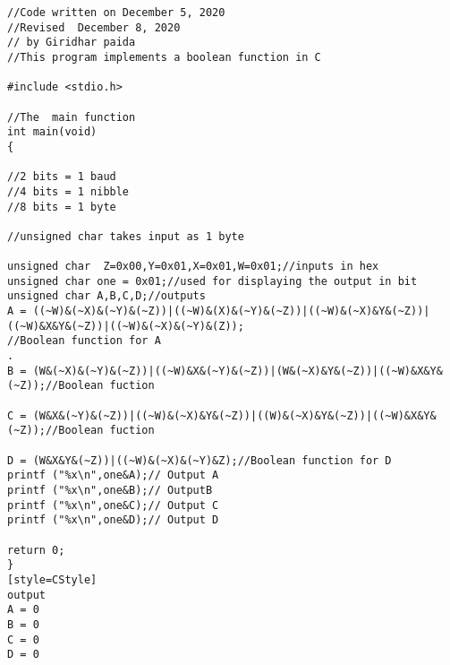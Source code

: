 \documentclass{article}
\begin{document}
\begin{lstlisting}[style=CStyle]
//Code written on December 5, 2020
//Revised  December 8, 2020
// by Giridhar paida
//This program implements a boolean function in C

#include <stdio.h>

//The  main function
int main(void)
{

//2 bits = 1 baud
//4 bits = 1 nibble
//8 bits = 1 byte

//unsigned char takes input as 1 byte

unsigned char  Z=0x00,Y=0x01,X=0x01,W=0x01;//inputs in hex	
unsigned char one = 0x01;//used for displaying the output in bit
unsigned char A,B,C,D;//outputs
A = ((~W)&(~X)&(~Y)&(~Z))|((~W)&(X)&(~Y)&(~Z))|((~W)&(~X)&Y&(~Z))|((~W)&X&Y&(~Z))|((~W)&(~X)&(~Y)&(Z));
//Boolean function for A
.
B = (W&(~X)&(~Y)&(~Z))|((~W)&X&(~Y)&(~Z))|(W&(~X)&Y&(~Z))|((~W)&X&Y&(~Z));//Boolean fuction

C = (W&X&(~Y)&(~Z))|((~W)&(~X)&Y&(~Z))|((W)&(~X)&Y&(~Z))|((~W)&X&Y&(~Z));//Boolean fuction

D = (W&X&Y&(~Z))|((~W)&(~X)&(~Y)&Z);//Boolean function for D
printf ("%x\n",one&A);// Output A 
printf ("%x\n",one&B);// OutputB
printf ("%x\n",one&C);// Output C
printf ("%x\n",one&D);// Output D

return 0;
}
[style=CStyle]
output
A = 0
B = 0
C = 0
D = 0
\end{lstlisting}
\end{document}
